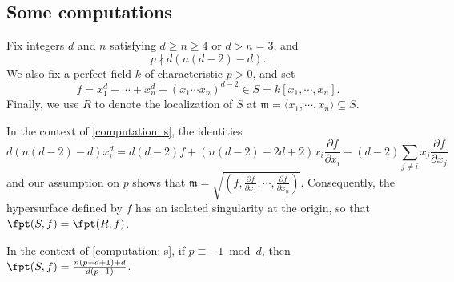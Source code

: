 \documentclass[11pt]{amsart}
\begin{document}
\subsection{Some computations}

\begin{setup}
\label{computation: s}
  Fix integers $d$ and $n$ satisfying $d \geq n \geq 4$ or $d > n = 3$, and  \[p \nmid d  ( n(d-2) - d). \]
We also fix a perfect field $k$ of characteristic $p>0$, and set \[ f = x_1^d + \cdots + x_n^d + (x_1 \cdots x_n)^{d-2} \in S =  k[x_1, \cdots, x_n].\]
Finally, we use $R$ to denote the localization of $S$ at ${\mathfrak{m}} =  \langle x_1, \cdots, x_n \rangle \subseteq S$.
\end{setup}

\begin{remark}
\label{isolatedSing: R}
In the context of \autoref{computation: s}, the identities
\[ d(n(d-2)-d) x_i^d = d(d-2)  f + (n(d-2) -2d + 2) x_i \frac{\partial f}{\partial x_i} - (d-2) \sum_{j \neq i } x_j \frac{\partial f}{\partial x_j} \]
and our assumption on $p$ shows that ${\mathfrak{m}} = \sqrt{(f, \frac{\partial f}{\partial x_1}, \cdots,  \frac{\partial f}{\partial x_n})}$.  Consequently, the hypersurface defined by $f$ has an isolated singularity at the origin, so that $\fpt(S, f) = \fpt(R, f)$.
\end{remark}

\begin{proposition}
\label{prop.PNotDividingDenominatorExample}
In the context of \autoref{computation: s}, if $p \equiv -1 \bmod d$, then $\fpt(S,f) = {n (p-d+1)+d \over d(p-1) }$.
\end{proposition}
\end{document}
